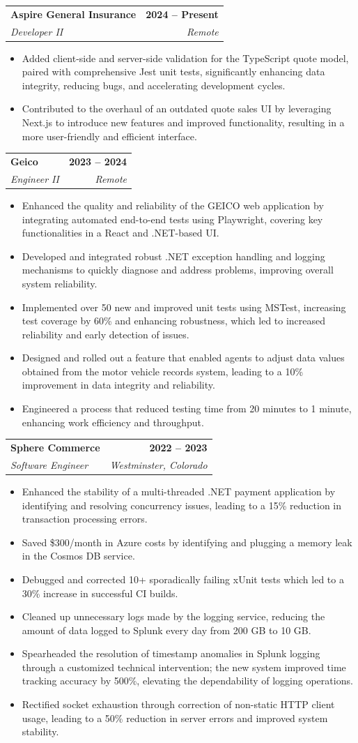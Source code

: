 \documentclass[letterpaper,11pt]{article}
\makeatletter
\newcommand{\resumeItem}[1]{
  \item\small{
    {#1 \vspace{2pt}}
  }
}
\newcommand{\resumeSubheading}[4]{
  \vspace{-2pt}\item
    \begin{tabular*}{1.0\textwidth}[t]{l@{\extracolsep{\fill}}r}
      \textbf{#1} & \textbf{\small #2} \\
      \textit{\small#3} & \textit{\small #4} \\
    \end{tabular*}\vspace{-7pt}
}
\newcommand{\resumeItemListStart}{\begin{itemize}}
\newcommand{\resumeItemListEnd}{\end{itemize}\vspace{-5pt}}
\makeatother
\begin{document}
\resumeSubheading
      {Aspire General Insurance}{2024 -- Present}
      {Developer II}{Remote}
      \resumeItemListStart
        \resumeItem{Added client-side and server-side validation for the TypeScript quote model, paired with comprehensive Jest unit tests, significantly enhancing data integrity, reducing bugs, and accelerating development cycles.}
        \resumeItem{Contributed to the overhaul of an outdated quote sales UI by leveraging Next.js to introduce new features and improved functionality, resulting in a more user-friendly and efficient interface.}      
    \resumeItemListEnd

  \resumeSubheading
      {Geico}{2023 -- 2024}
      {Engineer II}{Remote}
      \resumeItemListStart
	\resumeItem{Enhanced the quality and reliability of the GEICO web application by integrating automated end-to-end tests using Playwright, covering key functionalities in a React and .NET-based UI.}   
	\resumeItem{Developed and integrated robust .NET exception handling and logging mechanisms to quickly diagnose and address problems, improving overall system reliability.}
	\resumeItem{Implemented over 50 new and improved unit tests using MSTest, increasing test coverage by 60\% and enhancing robustness, which led to increased reliability and early detection of issues.}
	\resumeItem{Designed and rolled out a feature that enabled agents to adjust data values obtained from the motor vehicle records system, leading to a 10\% improvement in data integrity and reliability.}
	\resumeItem{Engineered a process that reduced testing time from 20 minutes to 1 minute, enhancing work efficiency and throughput.} 
      \resumeItemListEnd

  \resumeSubheading
      {Sphere Commerce}{2022 -- 2023}
      {Software Engineer}{Westminster, Colorado}
      \resumeItemListStart
	\resumeItem{Enhanced the stability of a multi-threaded .NET payment application by identifying and resolving concurrency issues, leading to a 15\% reduction in transaction processing errors.}
	\resumeItem{Saved \$300/month in Azure costs by identifying and plugging a memory leak in the Cosmos DB service.}
        \resumeItem{Debugged and corrected 10+ sporadically failing xUnit tests which led to a 30\% increase in successful CI builds.}
	\resumeItem{Cleaned up unnecessary logs made by the logging service, reducing the amount of data logged to Splunk every day from 200 GB to 10 GB.}
        \resumeItem{Spearheaded the resolution of timestamp anomalies in Splunk logging through a customized technical intervention; the new system improved time tracking accuracy by 500\%, elevating the dependability of logging operations. }       
	\resumeItem{Rectified socket exhaustion through correction of non-static HTTP client usage, leading to a 50\% reduction in server errors and improved system stability.}
      \resumeItemListEnd
\end{document}
